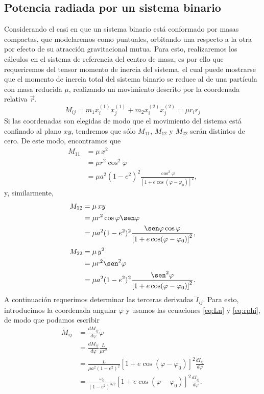 \subsection{Potencia radiada por un sistema binario}
Considerando el casi en que un sistema binario está conformado por masas compactas, que modelaremos como puntuales,
orbitando una respecto a la otra por efecto de su atracción gravitacional mutua. Para esto, realizaremos los cálculos en el sistema de referencia del centro de masa, es por ello
que requeriremos del tensor momento de inercia del sistema, el cual puede mostrarse que el momento de inercia total del sistema binario se reduce al de una partícula con masa reducida $\mu$, realizando un movimiento
descrito por la coordenada relativa $\vec{r}$.
\begin{equation*}
    M_{ij}=m_1x_i^{(1)}x_{j}^{(1)}+m_2x_i^{(2)}x_{j}^{(2)}=\mu r_ir_j
\end{equation*}
Si las coordenadas son elegidas de modo que el movimiento del sistema está confinado al plano $xy$, tendremos que sólo $M_{11}$, $M_{12}$ y $M_{22}$ serán distintos de cero. De este modo, encontramos que
\begin{align*}
M_{11} & = \mu\, x^2\\
& = \mu r^2\cos^2\varphi \\
& = \mu a^2(1-e^2)^2\frac{\cos^2\varphi}{\left[1+e\cos(\varphi-\varphi_0)\right]^2},
\end{align*}
y, similarmente,
\begin{align*}
M_{12} & = \mu\, xy \\
& = \mu r^2\cos\varphi\sen\varphi \\
& = \mu a^2(1-e^2)^2\frac{\sen\varphi\cos\varphi}{\left[1+e\cos(\varphi-\varphi_0)\right]^2},
\end{align*}
\begin{align*}
M_{22} & = \mu\, y^2 \\
& = \mu r^2\sen^2\varphi \\
& = \mu a^2(1-e^2)^2\frac{\sen^2\varphi}{\left[1+e\cos(\varphi-\varphi_0)\right]^2}.
\end{align*}
A continuación requerimos determinar las terceras derivadas $\dddot{I}_{ij}$. Para esto, introducimos la coordenada angular $\varphi$ y usamos las ecuaciones \ref{eq:Ln} y \ref{eq:rphi}, de modo que podamos escribir
\begin{align*}
\dot{M}_{ij} &= \frac{dM_{ij}}{d\varphi}\dot{\varphi} \\
&= \frac{dM_{ij}}{d\varphi}\frac{L}{\mu r^2} \\
&= \frac{L}{\mu a^2(1-e^2)^2}\left[1+e\cos(\varphi-\varphi_0)\right]^2 \frac{dI_{ij}}{d\varphi}\\
&= \frac{\omega_0}{(1-e^2)^{3/2}}\left[1+e\cos(\varphi-\varphi_0)\right]^2 \frac{dI_{ij}}{d\varphi}.
\end{align*}

